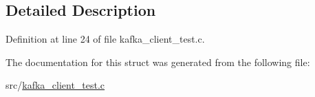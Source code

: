 \subsection{\-Detailed \-Description}


\-Definition at line 24 of file kafka\-\_\-client\-\_\-test.\-c.



\-The documentation for this struct was generated from the following file\-:\begin{DoxyCompactItemize}
\item 
src/\hyperlink{kafka__client__test_8c}{kafka\-\_\-client\-\_\-test.\-c}\end{DoxyCompactItemize}
